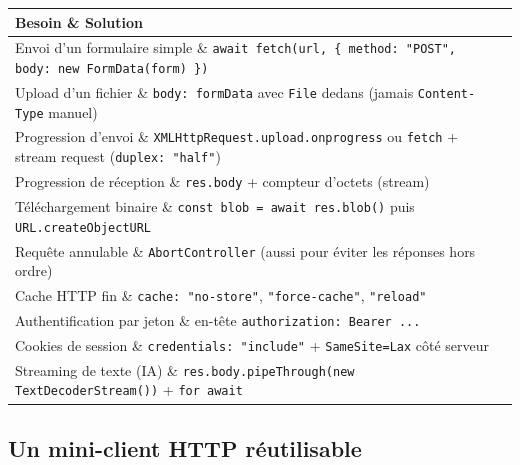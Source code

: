 \documentclass[12pt,a4paper,twoside,openright]{book}
\makeatletter
\newenvironment{tabz}[1]{\rowcolors{2}{white}{tralight}%
  \small\setlength{\tabcolsep}{5pt}\setlength{\LTpre}{3pt}\setlength{\LTpost}{3pt}%
  \begin{longtable}{@{}#1@{}}\toprule}
  {\bottomrule\end{longtable}\normalfont\setlength{\tabcolsep}{6pt}}
\newcommand{\thd}[1]{\textbf{\color{white}#1}}
\newcommand{\headrow}{\rowcolor{theadbg}}
\makeatother
\begin{document}
\begin{tabz}{lX}
  \headrow \thd{Besoin} \& \thd{Solution} \\
  \midrule
  Envoi d'un formulaire simple \& \verb|await fetch(url, { method: "POST", body: new FormData(form) })| \\
  Upload d'un fichier \& \verb|body: formData| avec \verb|File| dedans (jamais \verb|Content-Type| manuel) \\
  Progression d'envoi \& \verb|XMLHttpRequest.upload.onprogress| ou \verb|fetch| + stream request (\verb|duplex: "half"|) \\
  Progression de r\'eception \& \verb|res.body| + compteur d'octets (stream) \\
  T\'el\'echargement binaire \& \verb|const blob = await res.blob()| puis \verb|URL.createObjectURL| \\
  Requ\^ete annulable \& \verb|AbortController| (aussi pour \'eviter les r\'eponses hors ordre) \\
  Cache HTTP fin \& \verb|cache: "no-store"|, \verb|"force-cache"|, \verb|"reload"| \\
  Authentification par jeton \& en-t\^ete \verb|authorization: Bearer ...| \\
  Cookies de session \& \verb|credentials: "include"| + \verb|SameSite=Lax| c\^ot\'e serveur \\
  Streaming de texte (IA) \& \verb|res.body.pipeThrough(new TextDecoderStream())| + \verb|for await| \\
\end{tabz}

\subsection{Un mini-client HTTP r\'eutilisable}
\end{document}

